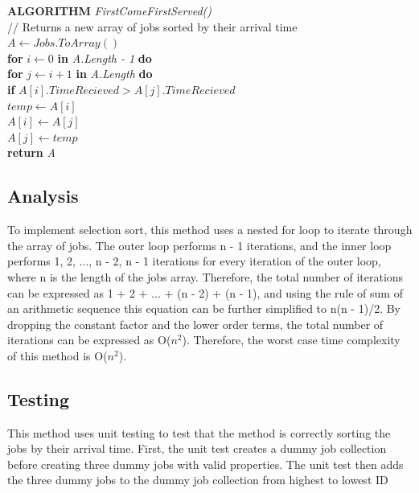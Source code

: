 \documentclass[12pt,a4paper]{article}
\begin{document}
			\textbf{ALGORITHM} \textit{FirstComeFirstServed()}\\
			\null\hspace{1cm}// Returns a new array of jobs sorted by their arrival time\\
			\null\hspace{1cm}\textit{$A \gets Jobs.ToArray()$}\\
			\null\hspace{1cm}\textbf{for} \textit{$i \gets 0$} \textbf{in} \textit{A.Length - 1} \textbf{do}\\
			\null\hspace{2cm}\textbf{for} \textit{$j \gets i + 1$} \textbf{in} \textit{A.Length} \textbf{do}\\
			\null\hspace{3cm}\textbf{if} \textit{$A[i].TimeRecieved > A[j].TimeRecieved$}\\
			\null\hspace{4cm}\textit{$temp \gets A[i]$}\\
			\null\hspace{4cm}\textit{$A[i] \gets A[j]$}\\
			\null\hspace{4cm}\textit{$A[j] \gets temp$}\\
			\null\hspace{1cm}\textbf{return} \textit{A}\\
		
		\subsection{Analysis}
			To implement selection sort, this method uses a nested for loop to iterate through the
			array of jobs. The outer loop performs n - 1 iterations, and the inner loop performs 
			1, 2, ..., n - 2, n - 1 iterations for every iteration of the outer loop, where n is 
			the length of the jobs array. Therefore, the total number of iterations can be expressed as 
			1 + 2 + ... + (n - 2) + (n - 1), and using the rule of sum of an arithmetic sequence 
			this equation can be further simplified to n(n - 1)/2. By dropping the constant factor and 
			the lower order terms, the total number of iterations can be expressed as O($n ^ 2$). Therefore, 
			the worst case time complexity of this method is O($n ^ 2$).\\
			
		\subsection{Testing}
			This method uses unit testing to test that the method is correctly sorting the jobs by 
			their arrival time. First, the unit test creates a dummy job collection before creating 
			three dummy jobs with valid properties. The unit test then adds the three dummy jobs to the 
			dummy job collection from highest to lowest ID
\end{document}
